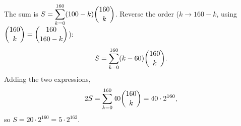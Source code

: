 The sum is $S=\displaystyle\sum_{k=0}^{160}(100-k)\dbinom{160}{k}$. Reverse the order ($k\to160-k$, using $\dbinom{160}{k}=\dbinom{160}{160-k}$):
\[S=\sum_{k=0}^{160}(k-60)\dbinom{160}{k}.\]
Adding the two expressions,
\[2S=\sum_{k=0}^{160}40\dbinom{160}{k}=40\cdot2^{160},\]
so $S=20\cdot2^{160}=\boxed{5\cdot2^{162}}$.
